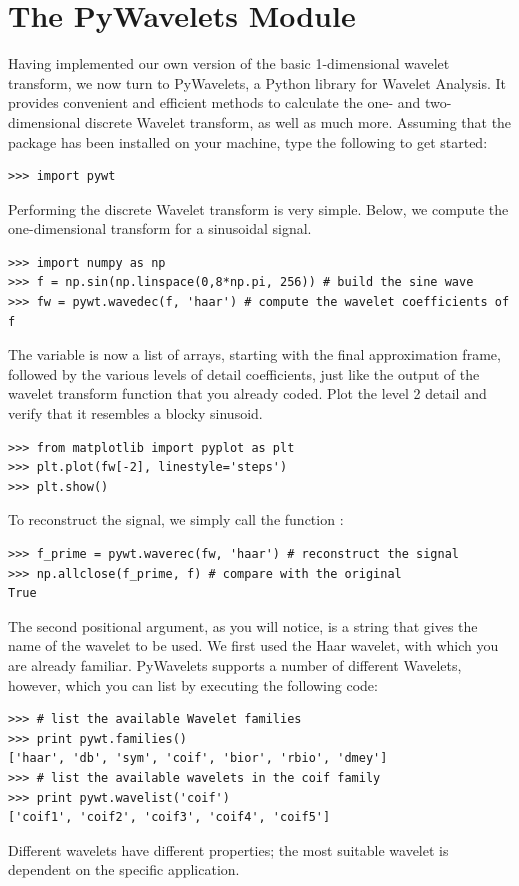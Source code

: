 \section*{The PyWavelets Module}
Having implemented our own version of the basic 1-dimensional wavelet transform, we now turn to
PyWavelets, a Python library for Wavelet Analysis.
It provides convenient and efficient methods to calculate the one- and two-dimensional discrete Wavelet
transform, as well as much more.
Assuming that the package has been installed on your machine, type the following to get started:
\begin{lstlisting}
>>> import pywt
\end{lstlisting}
Performing the discrete Wavelet transform is very simple.
Below, we compute the one-dimensional transform for a sinusoidal signal.
\begin{lstlisting}
>>> import numpy as np
>>> f = np.sin(np.linspace(0,8*np.pi, 256)) # build the sine wave
>>> fw = pywt.wavedec(f, 'haar') # compute the wavelet coefficients of f
\end{lstlisting}
The variable  is now a list of arrays, starting with the final approximation
frame, followed by the various levels of detail coefficients, just like the output
of the wavelet transform function that you already coded.
Plot the level 2 detail and verify that it resembles a blocky sinusoid.
\begin{lstlisting}
>>> from matplotlib import pyplot as plt
>>> plt.plot(fw[-2], linestyle='steps')
>>> plt.show()
\end{lstlisting}
To reconstruct the signal, we simply call the function :
\begin{lstlisting}
>>> f_prime = pywt.waverec(fw, 'haar') # reconstruct the signal
>>> np.allclose(f_prime, f) # compare with the original
True
\end{lstlisting}
The second positional argument, as you will notice, is a string that gives the name of the wavelet to be used.
We first used the Haar wavelet, with which you are already familiar.
PyWavelets supports a number of different Wavelets, however, which you can list by executing the following code:
\begin{lstlisting}
>>> # list the available Wavelet families
>>> print pywt.families()
['haar', 'db', 'sym', 'coif', 'bior', 'rbio', 'dmey']
>>> # list the available wavelets in the coif family
>>> print pywt.wavelist('coif')
['coif1', 'coif2', 'coif3', 'coif4', 'coif5']
\end{lstlisting}
Different wavelets have different properties; the most suitable wavelet is dependent on the specific application.
